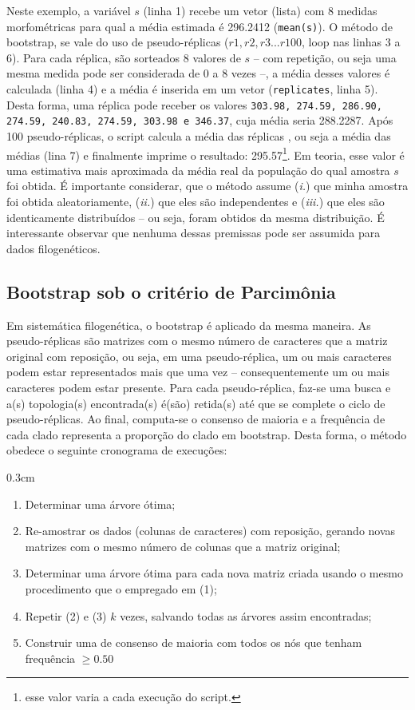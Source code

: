 \begin{refsection}
Neste exemplo, a variável $s$ (linha 1) recebe um vetor (lista) com 8 medidas morfométricas para qual a média estimada é 296.2412 (\texttt{mean(s)}). O método de bootstrap, se vale do uso de pseudo-réplicas ($r1, r2, r3 ... r100$, loop nas linhas 3 a 6). Para cada réplica, são sorteados 8 valores de $s$ -- com repetição, ou seja uma mesma medida pode ser considerada de 0 a 8 vezes --, a média desses valores é calculada (linha 4) e a média é inserida em um vetor (\texttt{replicates}, linha 5). Desta forma, uma réplica pode receber os valores \texttt{303.98, 274.59, 286.90, 274.59, 240.83, 274.59, 303.98 e 346.37}, cuja média seria 288.2287. Após 100 pseudo-réplicas, o script calcula a média das réplicas , ou seja a média das médias (lina 7) e finalmente imprime o resultado: 295.57\footnote{esse valor varia a cada execução do script.}. Em teoria, esse valor é uma estimativa mais aproximada da média real da população do qual amostra $s$ foi obtida. É importante considerar, que o método assume (\textit{i.}) que minha amostra foi obtida aleatoriamente, (\textit{ii.}) que eles são independentes e (\textit{iii.}) que eles são identicamente distribuídos -- ou seja, foram obtidos da mesma distribuição. É interessante observar que nenhuma dessas premissas pode ser assumida para dados filogenéticos.

\subsection{Bootstrap sob o critério de Parcimônia}\label{tut14:boots:pars}

Em sistemática filogenética, o bootstrap é aplicado da mesma maneira. As pseudo-réplicas são matrizes com o mesmo número de caracteres que a matriz original com reposição, ou seja, em uma pseudo-réplica, um ou mais caracteres podem estar representados mais que uma vez -- consequentemente um ou mais caracteres podem estar presente. Para cada pseudo-réplica, faz-se uma busca e a(s) topologia(s) encontrada(s) é(são) retida(s) até que se complete o ciclo de pseudo-réplicas. Ao final, computa-se o consenso de maioria e a frequência de cada clado representa a proporção do clado em bootstrap. Desta forma, o método obedece o seguinte cronograma de execuções:


\begin {myindentpar}{0.3cm}
\begin{enumerate}[1.]
\item Determinar uma árvore ótima;
\item Re-amostrar os dados (colunas de caracteres) com reposição, gerando novas matrizes com o mesmo número de colunas que a matriz original;
\item Determinar uma árvore ótima para cada nova matriz criada usando o mesmo procedimento que o empregado em (1);
\item Repetir (2) e (3) $k$ vezes, salvando todas as árvores assim encontradas;
\item Construir uma de consenso de maioria com todos os nós que tenham frequência $\geq 0.50$
\end{enumerate}
\end{myindentpar}


\end{refsection}
